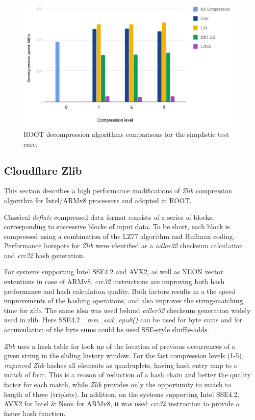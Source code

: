 \documentclass[12pt]{iopart}
\begin{document}
\begin{figure}[h]
\centering
\includegraphics[width=0.9\linewidth]{acat11.png}
\caption{ROOT decompression algorithms comparisons for the simplistic test case.}
\label{fig:decompression}
\end{figure}

\subsection{Cloudflare Zlib}

This section describes a high performance modifications of \textit{Zlib} compression algorithm for Intel/ARMv8 processors and adopted in ROOT.

Classical \textit{deflate} compressed data format consists of a series of blocks, corresponding to successive blocks of input data. To be short, each block is compressed using a combination of the LZ77 algorithm and Huffman coding. Performance hotspots for \textit{Zlib} were identified as a \textit{adler32} checksum calculation and \textit{crc32} hash generation.
 
For systems supporting Intel SSE4.2 and AVX2, as well as NEON vector extentions in case of ARMv8, \textit{crc32} instructions are improving both hash performance and hash calculation quality. Both factors results in a the speed improvements of the hashing operations, and also improves the string-matching time for zlib. The same idea was used behind \textit{adler32} checksum generation widely used in zlib. Here SSE4.2 \textit{\_mm\_sad\_epu8()} can be used for byte sums  and for accumulation of the byte sums could be used SSE-style shuffle-adds.
 
 \textit{Zlib} uses a hash table for look up of the location of previous occurrences of a given string in the sliding history window. For the fast compression levels (1-5), \textit{improved Zlib} hashes all elements as quadruplets, having hash entry map to a match of four. This is a reason of reduction of a hash chain and better the quality factor for each match, while \textit{Zlib} provides only the opportunity to match to length of three (triplets). In addition, on the systems supporting Intel SSE4.2, AVX2 for Intel \& Neon for ARMv8, it was used \textit{crc32} instruction to provide a faster hash function.
\end{document}
